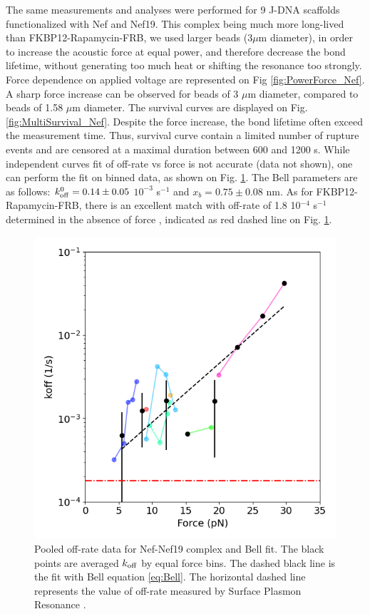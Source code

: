 \documentclass{biophys-new}
\begin{document}
The same measurements and analyses were performed for 9 J-DNA scaffolds functionalized with Nef and Nef19. This complex being much more long-lived than FKBP12-Rapamycin-FRB, we used larger beads (3$\mu$m diameter), in order to increase the acoustic force at equal power, and therefore decrease the bond lifetime, without generating too much heat or shifting the resonance too strongly. Force dependence on applied voltage are represented on Fig \ref{fig:PowerForce_Nef}. A sharp force increase can be observed for beads of 3 $\mu$m diameter, compared to beads of 1.58 $\mu$m diameter. The survival curves are displayed on Fig. \ref{fig:MultiSurvival_Nef}. Despite the force increase, the bond lifetime often exceed the measurement time. Thus, survival curve contain a limited number of rupture events and are censored at a maximal duration between 600 and 1200 s. While independent curves fit of off-rate vs force is not accurate (data not shown), one can perform the fit on binned data, as shown on Fig. \ref{fig:bell_parameters_Nef}. The Bell parameters are as follows:  $k^0_{\rm off}=0.14 \pm 0.05$  $10^{-3}$  s$^{-1}$ and $x_b = 0.75 \pm 0.08$ nm. As for FKBP12-Rapamycin-FRB, there is an excellent match with off-rate of 1.8 10$^{-4}$ s$^{-1}$ determined in the absence of force \cite{bouchet2011}, indicated as red dashed line on Fig. \ref{fig:bell_parameters_Nef}.
 
\begin{figure}[hbt!]
	\centering
		\includegraphics[width=0.4\linewidth]{Figures/offrate_vs_force_Nef.png}	
	\caption{Pooled off-rate data for Nef-Nef19 complex and Bell fit. The black points are averaged $k_{\rm off}$ by equal force bins. The dashed black line is the fit with Bell equation \ref{eq:Bell}. The horizontal dashed line represents the value of off-rate measured by Surface Plasmon Resonance \cite{bouchet2011}.} %
	\label{fig:bell_parameters_Nef}	
\end{figure}
\end{document}

